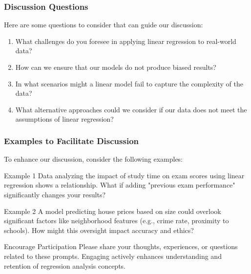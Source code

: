 \documentclass[aspectratio=169]{beamer}
\begin{document}
\begin{frame}[fragile]
    \frametitle{Discussion Questions}
    Here are some questions to consider that can guide our discussion:

    \begin{enumerate}
        \item What challenges do you foresee in applying linear regression to real-world data?
        \item How can we ensure that our models do not produce biased results?
        \item In what scenarios might a linear model fail to capture the complexity of the data?
        \item What alternative approaches could we consider if our data does not meet the assumptions of linear regression?
    \end{enumerate}
\end{frame}

\begin{frame}[fragile]
    \frametitle{Examples to Facilitate Discussion}
    To enhance our discussion, consider the following examples:

    \begin{block}{Example 1}
        Data analyzing the impact of study time on exam scores using linear regression shows a relationship. What if adding "previous exam performance" significantly changes your results?
    \end{block}

    \begin{block}{Example 2}
        A model predicting house prices based on size could overlook significant factors like neighborhood features (e.g., crime rate, proximity to schools). How might this oversight impact accuracy and ethics?
    \end{block}

    \begin{block}{Encourage Participation}
        Please share your thoughts, experiences, or questions related to these prompts. Engaging actively enhances understanding and retention of regression analysis concepts.
    \end{block}
\end{frame}
\end{document}
